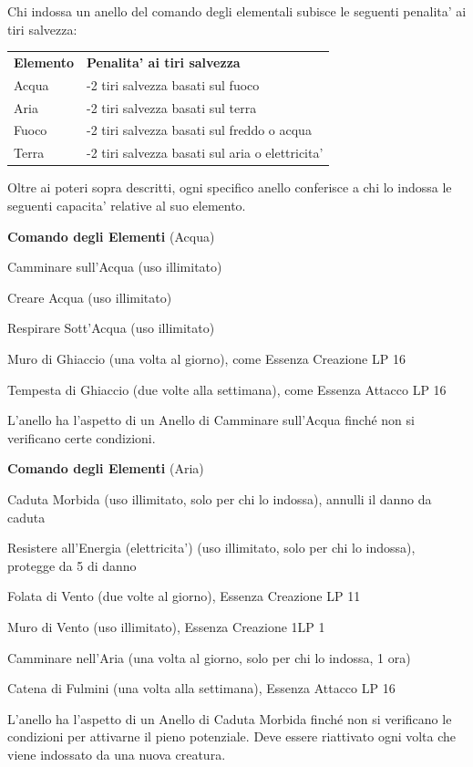 \documentclass[a4paper,11pt,twoside,openany]{book}
\begin{document}
{		Chi indossa un anello del comando degli elementali subisce le seguenti
		penalita' ai tiri salvezza:
		
		\begin{tabular}{ll}
			\toprule
			\textbf{Elemento} & \textbf{Penalita' ai tiri salvezza}\tabularnewline
			Acqua & -2 tiri salvezza basati sul fuoco\tabularnewline
			Aria & -2 tiri salvezza basati sul terra\tabularnewline
			Fuoco & -2 tiri salvezza basati sul freddo o acqua\tabularnewline
			Terra & -2 tiri salvezza basati sul aria o elettricita'\tabularnewline
			
		\end{tabular}
		
		Oltre ai poteri sopra descritti, ogni specifico anello conferisce
		a chi lo indossa le seguenti capacita' relative al suo elemento.
		
		\textbf{Comando degli Elementi} (Acqua)
		
		Camminare sull'Acqua (uso illimitato)
		
		Creare Acqua (uso illimitato)
		
		Respirare Sott'Acqua (uso illimitato)
		
		Muro di Ghiaccio (una volta al giorno), come Essenza Creazione LP 16
		
		Tempesta di Ghiaccio (due volte alla settimana), come Essenza Attacco LP 16
		
		L'anello ha l'aspetto di un Anello di Camminare sull'Acqua finché non si verificano certe condizioni.
		
		\textbf{Comando degli Elementi} (Aria)
		
		Caduta Morbida (uso illimitato, solo per chi lo indossa), annulli il danno da caduta
		
		Resistere all'Energia (elettricita') (uso illimitato, solo per chi lo indossa), protegge da 5 di danno
		
		Folata di Vento (due volte al giorno), Essenza Creazione LP 11
		
		Muro di Vento (uso illimitato), Essenza Creazione 1LP 1
		
		Camminare nell'Aria (una volta al giorno, solo per chi lo indossa, 1 ora)
		
		Catena di Fulmini (una volta alla settimana), Essenza Attacco LP 16
		
		L'anello ha l'aspetto di un Anello di Caduta Morbida finché non si verificano le condizioni per attivarne il pieno potenziale. Deve essere riattivato ogni volta che viene indossato da una nuova creatura. 
		
}
\end{document}

